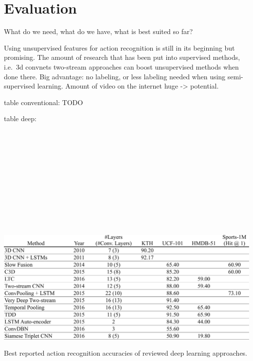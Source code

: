 \section{Evaluation}
What do we need, what do we have, what is best suited so far?

Using unsupervised features for action recognition is still in its beginning but promising.
The amount of research that has been put into supervised methods, i.e.\ 3d convnets two-stream approaches can boost unsupervised methods when done there.
Big advantage: no labeling, or less labeling needed when using semi-supervised learning.
Amount of video on the internet huge -> potential.

table conventional:
TODO

table deep:\\
\cite{ji_3d_2013}\\
\cite{baccouche_sequential_2011}\\
\cite{karpathy_large-scale_2014}\\
\cite{tran_learning_2015}\\
\cite{varol_long-term_2016}\\
\cite{simonyan_two-stream_2014}\\
\cite{ng_beyond_2015}\\
\cite{wang_towards_2015}\\
\cite{feichtenhofer_convolutional_2016}\\
\cite{wang_action_2015}\\
\cite{srivastava_unsupervised_2015}\\

\begin{table}[H]
    \centering
    \includegraphics[width=\textwidth]{img_evaluation/deep_results}
    \caption{Best reported action recognition accuracies of reviewed deep learning approaches.}
    \label{tab:deep_results}
\end{table}


